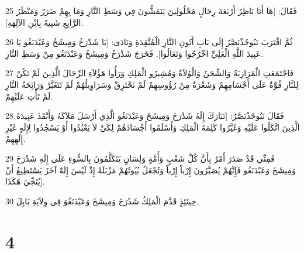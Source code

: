 \par 25 فَقَالَ: [هَا أَنَا نَاظِرٌ أَرْبَعَةَ رِجَالٍ مَحْلُولِينَ يَتَمَشُّونَ فِي وَسَطِ النَّارِ وَمَا بِهِمْ ضَرَرٌ وَمَنْظَرُ الرَّابِعِ شَبِيهٌ بِابْنِ الآلِهَةِ].
\par 26 ثُمَّ اقْتَرَبَ نَبُوخَذْنَصَّرُ إِلَى بَابِ أَتُونِ النَّارِ الْمُتَّقِدَةِ وَنَادَى: [يَا شَدْرَخُ وَمِيشَخُ وَعَبْدَنَغُو يَا عَبِيدَ اللَّهِ الْعَلِيِّ اخْرُجُوا وَتَعَالُوا]. فَخَرَجَ شَدْرَخُ وَمِيشَخُ وَعَبْدَنَغُو مِنْ وَسَطِ النَّارِ.
\par 27 فَاجْتَمَعَتِ الْمَرَازِبَةُ وَالشِّحَنُ وَالْوُلاَةُ وَمُشِيرُو الْمَلِكِ وَرَأُوا هَؤُلاَءِ الرِّجَالَ الَّذِينَ لَمْ تَكُنْ لِلنَّارِ قُوَّةٌ عَلَى أَجْسَامِهِمْ وَشَعْرَةٌ مِنْ رُؤُوسِهِمْ لَمْ تَحْتَرِقْ وَسَرَاوِيلُهُمْ لَمْ تَتَغَيَّرْ وَرَائِحَةُ النَّارِ لَمْ تَأْتِ عَلَيْهِمْ.
\par 28 فَقَالَ نَبُوخَذْنَصَّرُ: [تَبَارَكَ إِلَهُ شَدْرَخَ وَمِيشَخَ وَعَبْدَنَغُو الَّذِي أَرْسَلَ مَلاَكَهُ وَأَنْقَذَ عَبِيدَهُ الَّذِينَ اتَّكَلُوا عَلَيْهِ وَغَيَّرُوا كَلِمَةَ الْمَلِكِ وَأَسْلَمُوا أَجْسَادَهُمْ لِكَيْ لاَ يَعْبُدُوا أَوْ يَسْجُدُوا لِإِلَهٍ غَيْرِ إِلَهِهِمْ.
\par 29 فَمِنِّي قَدْ صَدَرَ أَمْرٌ بِأَنَّ كُلَّ شَعْبٍ وَأُمَّةٍ وَلِسَانٍ يَتَكَلَّمُونَ بِالسُّوءِ عَلَى إِلَهِ شَدْرَخَ وَمِيشَخَ وَعَبْدَنَغُو فَإِنَّهُمْ يُصَيَّرُونَ إِرْباً إِرْباً وَتُجْعَلُ بُيُوتُهُمْ مَزْبَلَةً إِذْ لَيْسَ إِلَهٌ آخَرُ يَسْتَطِيعُ أَنْ يُنَجِّيَ هَكَذَا].
\par 30 حِينَئِذٍ قَدَّمَ الْمَلِكُ شَدْرَخَ وَمِيشَخَ وَعَبْدَنَغُوَ فِي وِلاَيَةِ بَابِلَ.

\chapter{4}

